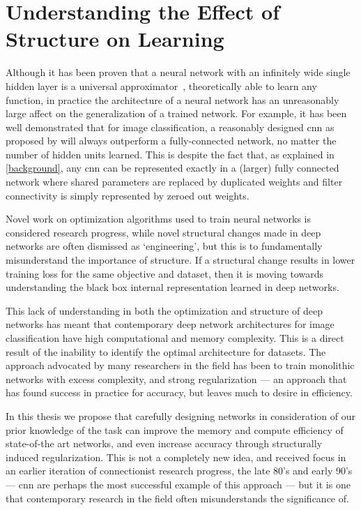 \documentclass[thesis]{subfiles}
\begin{document}
\section{Understanding the Effect of Structure on Learning}
Although it has been proven that a neural network with an infinitely wide single hidden layer is a universal approximator~\citep{journals/mcss/Cybenko92,hornik89a},  theoretically able to learn any function, in practice the architecture of a neural network has an unreasonably large affect on the generalization of a trained network. For example, it has been well demonstrated that for image classification, a reasonably designed \gls{cnn} as proposed by \citet{Lecun1998} will always outperform a fully-connected network, no matter the number of hidden units learned. This is despite the fact that, as explained in \cref{background}, any \gls{cnn} can be represented exactly in a (larger) fully connected network where shared parameters are replaced by duplicated weights and filter connectivity is simply represented by zeroed out weights.

Novel work on optimization algorithms used to train neural networks is considered research progress, while novel structural changes made in deep networks are often dismissed as `engineering', but this is to fundamentally misunderstand the importance of structure. If a structural change results in lower training loss for the same objective and dataset, then it is moving towards understanding the black box internal representation learned in deep networks. %

This lack of understanding in both the optimization and structure of deep networks has meant that contemporary deep network architectures for image classification have high computational and memory complexity. This is a direct result of the inability to identify the optimal architecture for datasets. The approach advocated by many researchers in the field has been to train monolithic networks with excess complexity, and strong regularization --- an approach that has found success in practice for accuracy, but leaves much to desire in efficiency.

In this thesis we propose that carefully designing networks in consideration of our prior knowledge of the task can improve the memory and compute efficiency of state-of-the art networks, and even increase accuracy through structurally induced regularization. This is not a completely new idea, and received focus in an earlier iteration of connectionist research progress, the late 80's and early 90's --- \gls{cnn} are perhaps the most successful example of this approach --- but it is one that contemporary research in the field often misunderstands the significance of.
\end{document}
